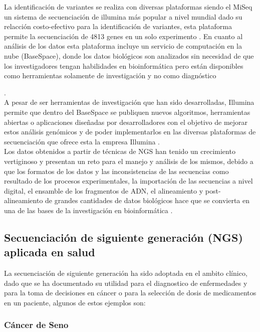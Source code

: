 La identificación de variantes se realiza con diversas plataformas siendo el MiSeq un sistema de secuenciación de illumina  más popular a nivel mundial dado su relacción costo-efectivo para la identificación de variantes, esta plataforma permite la secuenciación de 4813 genes en un solo experimento \cite{Illumina2017}. En cuanto al análisis de los datos esta plataforma incluye un servicio de computación en la nube (BaseSpace), donde los datos biológicos son analizados  sin necesidad de que los investigadores tengan habilidades en bioinformática pero están disponibles como herramientas solamente de investigación y no como diagnóstico {\cite{Illumina2017}. \\

A pesar de ser herramientas de investigación  que han sido desarrolladas, Illumina permite que dentro del BaseSpace se publiquen nuevos algoritmos, herramientas abiertas o aplicaciones diseñadas por desarrolladores con el objetivo de mejorar estos análisis genómicos y  de poder implementarlos en las diversas plataformas de secuenciación que ofrece esta la empresa Illumina \cite{Illumina2017}. \\

Los datos obtenidos a partir de técnicas de NGS han tenido un crecimiento vertiginoso y presentan un reto para el manejo y análisis de los mismos, debido a que los formatos de los datos y las inconsistencias de las secuencias como resultado de los procesos experimentales, la importación de las secuencias a nivel digital, el ensamble de los fragmentos de ADN, el alineamiento y post-alineamiento de grandes cantidades de datos biológicos hace que se convierta en una de las bases de la investigación en bioinformática \cite{Deng2011,Triplet2014}.

\subsection*{Secuenciación de siguiente generación (NGS) aplicada en salud}

La secuenciación de siguiente generación ha sido adoptada en el ambito clínico, dado que se ha documentado su utilidad para el diagnostico de enfermedades  y para la toma de decisiones en cáncer o para la selección de dosis de medicamentos en un paciente, \cite{Lubin2017} algunos de estos ejemplos son:

\subsubsection*{Cáncer de Seno}

}
